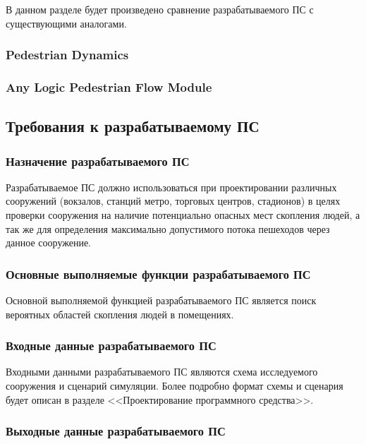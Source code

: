В данном разделе будет произведено сравнение разрабатываемого ПС с существующими аналогами.

\subsubsection{Pedestrian Dynamics}
\label{sub:domain:analogs:pd}

\subsubsection{Any Logic Pedestrian Flow Module}
\label{sub:domain:analogs:anylogic}

\subsection{Требования к разрабатываемому ПС}
\label{sub:domain:requirements}

\subsubsection{Назначение разрабатываемого ПС}
\label{sub:domain:requirements:purpose}

Разрабатываемое ПС должно использоваться при проектировании различных сооружений (вокзалов, станций метро, торговых центров, стадионов) в целях проверки сооружения на наличие потенциально опасных мест скопления людей, а так же для определения максимально допустимого потока пешеходов через данное сооружение.

\subsubsection{Основные выполняемые функции разрабатываемого ПС}
\label{sub:domain:requirements:purpose}

Основной выполняемой функцией разрабатываемого ПС является поиск вероятных областей скопления людей в помещениях.

\subsubsection{Входные данные разрабатываемого ПС}
\label{sub:domain:requirements:purpose}

Входными данными разрабатываемого ПС являются схема исследуемого сооружения и сценарий симуляции.
Более подробно формат схемы и сценария будет описан в разделе <<Проектирование программного средства>>.

\subsubsection{Выходные данные разрабатываемого ПС}
\label{sub:domain:requirements:purpose}

